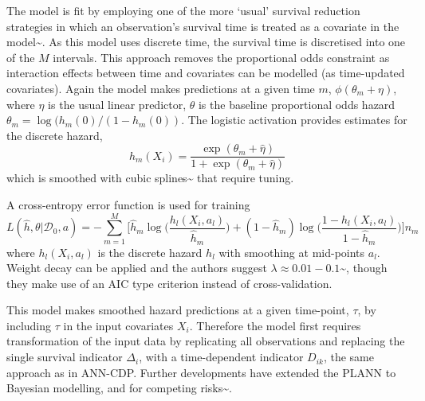 \documentclass[
  letterpaper,
]{scrbook}
\theoremstyle{plain}
\theoremstyle{definition}
\theoremstyle{remark}
\begin{document}
The model is fit by employing one of the more `usual' survival reduction
strategies in which an observation's survival time is treated as a
covariate in the model\textasciitilde{}\cite{Tutz2016}. As this model
uses discrete time, the survival time is discretised into one of the
\(M\) intervals. This approach removes the proportional odds constraint
as interaction effects between time and covariates can be modelled (as
time-updated covariates). Again the model makes predictions at a given
time \(m\), \(\phi(\theta_m + \eta)\), where \(\eta\) is the usual
linear predictor, \(\theta\) is the baseline proportional odds hazard
\(\theta_m = \log(h_m(0)/(1-h_m(0))\). The logistic activation provides
estimates for the discrete hazard, \[
h_m(X_i) = \frac{\exp(\theta_m + \hat{\eta})}{1 + \exp(\theta_m + \hat{\eta})}
\] which is smoothed with cubic splines\textasciitilde{}\cite{Efron1988}
that require tuning.

A cross-entropy error function is used for training \[
L(\hat{h}, \theta|\mathcal{D}_0, a) = - \sum^M_{m = 1} \Big[\hat{h}_m \log \Big(\frac{h_l(X_i, a_l)}{\hat{h}_m}\Big) + (1 - \hat{h}_m) \log \Big(\frac{1 - h_l(X_i, a_l)}{1 - \hat{h}_m}\Big)\Big]n_m
\] where \(h_l(X_i, a_l)\) is the discrete hazard \(h_l\) with smoothing
at mid-points \(a_l\). Weight decay can be applied and the authors
suggest
\(\lambda \approx 0.01-0.1\)\textasciitilde{}\cite{Biganzoli1998},
though they make use of an AIC type criterion instead of
cross-validation.

This model makes smoothed hazard predictions at a given time-point,
\(\tau\), by including \(\tau\) in the input covariates \(X_i\).
Therefore the model first requires transformation of the input data by
replicating all observations and replacing the single survival indicator
\(\Delta_i\), with a time-dependent indicator \(D_{ik}\), the same
approach as in ANN-CDP. Further developments have extended the PLANN to
Bayesian modelling, and for competing
risks\textasciitilde{}\cite{Biganzoli2009}.
\end{document}
